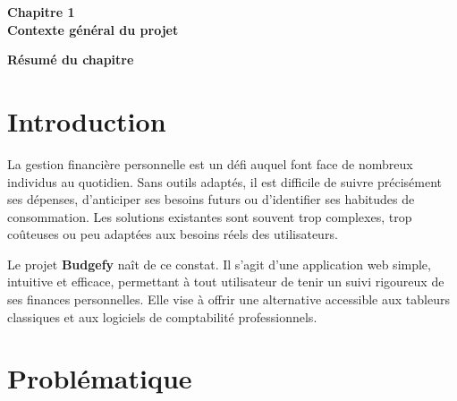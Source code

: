 \documentclass{rapportPFA}
\begin{document}
\newpage
{}
{}
\vspace*{3cm}
\begin{center}
    {\Huge \textbf{Chapitre 1}}\\[0.5cm]
    {\LARGE \textbf{Contexte g\'en\'eral du projet}}
\end{center}
\vspace{2cm}

\begin{center}
    \textbf{R\'esum\'e du chapitre}
\end{center}
\begin{center}
\end{center}

\newpage
\setcounter{section}{0}
\renewcommand{\thesection}{1.\arabic{section}}

\section{Introduction}

La gestion financi\`ere personnelle est un d\'efi auquel font face de nombreux individus
au quotidien. Sans outils adapt\'es, il est difficile de suivre pr\'ecis\'ement ses
d\'epenses, d'anticiper ses besoins futurs ou d'identifier ses habitudes de consommation.
Les solutions existantes sont souvent trop complexes, trop co\^uteuses ou peu adapt\'ees
aux besoins r\'eels des utilisateurs.

Le projet \textbf{Budgefy} na\^it de ce constat. Il s'agit d'une application web simple,
intuitive et efficace, permettant \`a tout utilisateur de tenir un suivi rigoureux de ses
finances personnelles. Elle vise \`a offrir une alternative accessible aux tableurs classiques
et aux logiciels de comptabilit\'e professionnels.

\section{Probl\'ematique}
\end{document}
